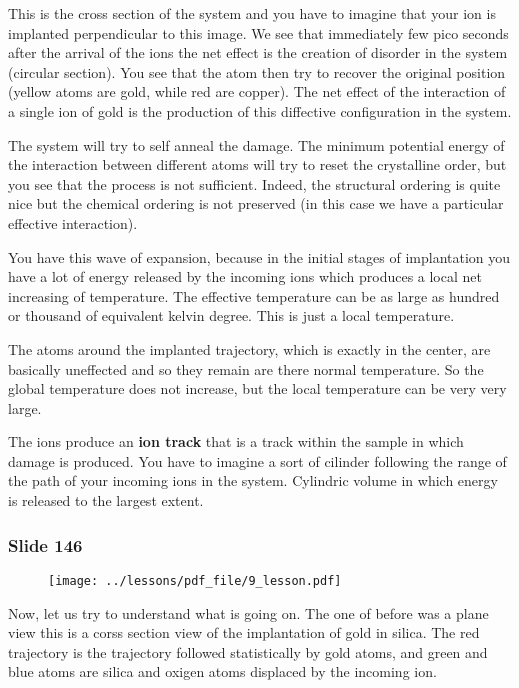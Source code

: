 \documentclass[../main/main.tex]{subfiles}
\begin{document}
This is the cross section of the system and you have to imagine that your ion is implanted perpendicular to this image.
We see that immediately few pico seconds after the arrival of the ions the net effect is the creation of disorder in the system (circular section). You see that the atom then try to recover the original position (yellow atoms are gold, while red are copper). The net effect of the interaction of a single ion of gold is the production of this diffective configuration in the system.

The system will try to self anneal the damage. The minimum potential energy of the interaction between different atoms will try to reset the crystalline order, but you see that the process is not sufficient. Indeed, the structural ordering is quite nice but the chemical ordering is not preserved (in this case we have a particular effective interaction).

You have this wave of expansion, because in the initial stages of implantation you have a lot of energy released by the incoming ions which produces a local net increasing of temperature. The effective temperature can be as large as hundred or thousand of equivalent kelvin degree. This is just a local temperature.

The atoms around the implanted trajectory, which is exactly in the center, are basically uneffected and so they remain are there normal temperature. So the global temperature does not increase, but the local temperature can be very very large.

The ions produce an \textbf{ion track} that is a track within the sample in which damage is produced. You have to imagine a sort of cilinder following the range of the path of your incoming ions in the system. Cylindric volume in which energy is released to the largest extent.

\newpage

\subsubsection{Slide 146}


\begin{figure}[h!]
\centering
\texttt{[image: ../lessons/pdf\_file/9\_lesson.pdf]}
\end{figure}

Now, let us try to understand what is going on. The one of before was a plane view this is a corss section view of the implantation of gold in silica. The red trajectory is the trajectory followed statistically by gold atoms, and green and blue atoms are silica and oxigen atoms displaced by the incoming ion.
\end{document}
